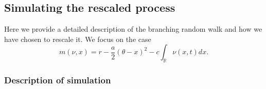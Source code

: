 \documentclass[]{article}
\begin{document}
\hypertarget{simulating-the-rescaled-process}{%
\subsection{\texorpdfstring{Simulating the rescaled process
\label{numerical}}{Simulating the rescaled process }}\label{simulating-the-rescaled-process}}

Here we provide a detailed description of the branching random walk and
how we have chosen to rescale it. We focus on the case \begin{equation}
m(\nu,x)=r-\frac{a}{2}(\theta-x)^2-c\int_\mathbb{R}\nu(x,t)dx.
\end{equation}

\hypertarget{description-of-simulation}{%
\subsubsection{\texorpdfstring{Description of simulation
\label{description}}{Description of simulation }}\label{description-of-simulation}}
\end{document}
